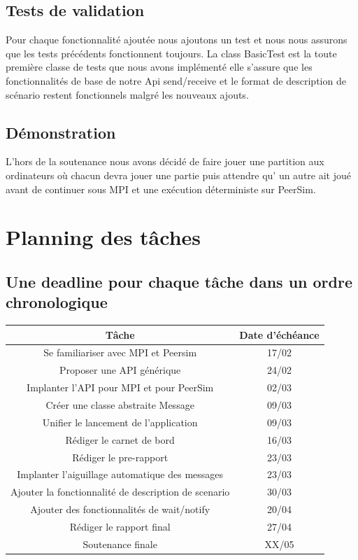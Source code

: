 \documentclass{article}
\begin{document}
		\subsection{Tests de validation}
		Pour chaque fonctionnalité ajoutée nous ajoutons un test et nous nous assurons que les tests précédents fonctionnent toujours.
		\newline
		La class BasicTest est la toute première classe de tests que nous avons implémenté elle s'assure que les fonctionnalités de base de notre Api
		send/receive et le format de description de scénario restent fonctionnels malgré les nouveaux ajouts.
		\subsection{Démonstration}
		L'hors de la soutenance nous avons décidé de faire jouer une partition aux ordinateurs où chacun devra jouer une partie puis attendre qu'
		un autre ait joué avant de continuer sous MPI et une exécution déterministe sur PeerSim.
		\section{Planning des tâches}
			\subsection{Une deadline pour chaque tâche dans un ordre chronologique}
			\begin{tabular}{|c|c|}
				\hline
				Tâche & Date d'échéance \\[1mm]
				\hline
				Se familiariser avec MPI et Peersim & 17/02 \\[1mm]
				\hline
				Proposer une API générique & 24/02 \\[1mm]
				\hline
				Implanter l'API pour MPI et pour PeerSim & 02/03 \\[1mm]
				\hline
				Créer une classe abstraite Message & 09/03 \\[1mm]
				\hline
				Unifier le lancement de l'application & 09/03 \\[1mm]
				\hline
				Rédiger le carnet de bord & 16/03 \\[1mm]
				\hline
				Rédiger le pre-rapport & 23/03 \\[1mm]
				\hline 
				Implanter l'aiguillage automatique des messages & 23/03 \\[1mm]
				\hline
				Ajouter la fonctionnalité de description de scenario & 30/03 \\[1mm]
				\hline
				Ajouter des fonctionnalités de wait/notify & 20/04 \\[1mm]
				\hline 
				Rédiger le rapport final & 27/04 \\[1mm]
				\hline
				Soutenance finale & XX/05 \\[1mm]
				\hline
			\end{tabular}
\end{document}

